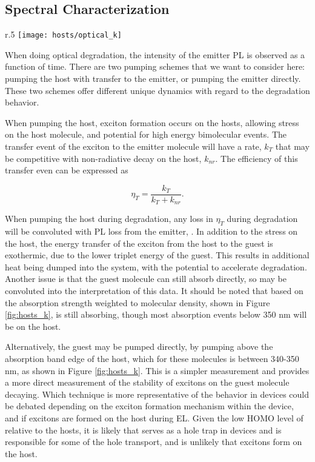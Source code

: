 \documentclass[../thesis.tex]{subfiles}
\begin{document}
\subsection{Spectral Characterization}\label{sec:hosts_spectral}


\begin{wrapfigure}{r}{.5\textwidth}
\centering
\texttt{[image: hosts/optical\_k]}
\caption{Optical constant $k$ for all hosts turn on between 340-350 nm. }
\label{fig:hosts_k}
\end{wrapfigure}

When doing optical degradation, the intensity of the emitter PL is observed as a function of time.
There are two pumping schemes that we want to consider here: pumping the host with transfer to the emitter, or pumping the emitter directly.
These two schemes offer different unique dynamics with regard to the degradation behavior.

When pumping the host, exciton formation occurs on the hosts, allowing stress on the host molecule, and potential for high energy bimolecular events.
The transfer event of the exciton to the emitter molecule will have a rate, $k_T$ that may be competitive with non-radiative decay on the host, $k_{nr}$.  
The efficiency of this transfer even can be expressed as 

\begin{equation}
\eta_T=\frac{k_T}{k_T +k_{nr}}.
\end{equation}

When pumping the host during degradation, any loss in $\eta_T$ during degradation will be convoluted with PL loss from the emitter, \pl.
In addition to the stress on the host, the energy transfer of the exciton from the host to the guest is exothermic, due to the lower triplet energy of the guest.
This results in additional heat being dumped into the system, with the potential to accelerate degradation.
Another issue is that the guest molecule can still absorb directly, so may be convoluted into the interpretation of this data.
It should be noted that based on the absorption strength weighted to molecular density, shown in Figure \ref{fig:hosts_k}, \irppy is still absorbing, though most absorption events below 350 nm will be on the host.

Alternatively, the guest may be pumped directly, by pumping above the absorption band edge of the host, which for these molecules is between 340-350 nm, as shown in Figure \ref{fig:hosts_k}.
This is a simpler measurement and provides a more direct measurement of the stability of excitons on the guest molecule decaying.
Which technique is more representative of the behavior in devices could be debated depending on the exciton formation mechanism within the device, and if excitons are formed on the host during EL.
Given the low HOMO level of  \irppy relative to the hosts, it is likely that \irppy serves as a hole trap in devices and is responsible for some of the hole transport, and is unlikely that excitons form on the host.
\end{document}
